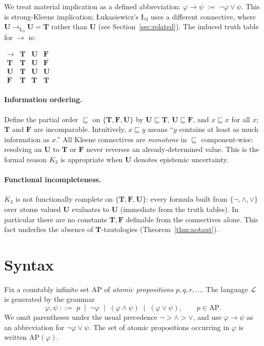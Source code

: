 \documentclass[11pt,a4paper]{article}
\theoremstyle{definition}
\theoremstyle{plain}
\theoremstyle{remark}
\newcommand{\Tv}{\mathbf{T}}
\newcommand{\Fv}{\mathbf{F}}
\newcommand{\Uv}{\mathbf{U}}
\newcommand{\Vals}{\{\Tv, \Fv, \Uv\}}
\newcommand{\Lang}{\mathcal{L}}
\newcommand{\AP}{\mathrm{AP}}
\begin{document}
We treat material implication as a defined abbreviation: $\varphi \to
\psi \;:=\; \lnot\varphi \lor \psi$. This is strong-Kleene implication;
{\L}ukasiewicz's $\text{\L}_3$ uses a different connective, where
$\Uv \to_{\text{\L}_3} \Uv = \Tv$ rather than $\Uv$ (see
Section~\ref{sec:related}). The induced truth table for $\to$ is:
\begin{center}
$\begin{array}{c|ccc}
\to & \Tv & \Uv & \Fv \\ \hline
\Tv & \Tv & \Uv & \Fv \\
\Uv & \Tv & \Uv & \Uv \\
\Fv & \Tv & \Tv & \Tv
\end{array}$
\end{center}

\paragraph{Information ordering.}
Define the partial order $\sqsubseteq$ on $\Vals$ by $\Uv \sqsubseteq \Tv$,
$\Uv \sqsubseteq \Fv$, and $x \sqsubseteq x$ for all $x$; $\Tv$ and $\Fv$
are incomparable. Intuitively, $x \sqsubseteq y$ means ``$y$ contains at
least as much information as $x$.'' All Kleene connectives are
\emph{monotone} in $\sqsubseteq$ component-wise: resolving an $\Uv$ to
$\Tv$ or $\Fv$ never reverses an already-determined value. This is the
formal reason $K_3$ is appropriate when $\Uv$ denotes epistemic
uncertainty.

\paragraph{Functional incompleteness.}
$K_3$ is not functionally complete on $\Vals$: every formula built from
$\{\lnot, \land, \lor\}$ over atoms valued $\Uv$ evaluates to $\Uv$
(immediate from the truth tables). In particular there are no constants
$\Tv, \Fv$ definable from the connectives alone. This fact underlies the
absence of $\Tv$-tautologies (Theorem~\ref{thm:notaut}).

\section{Syntax}
\label{sec:syntax}

Fix a countably infinite set $\AP$ of \emph{atomic propositions}
$p, q, r, \ldots$. The language $\Lang$ is generated by the grammar
\[
\varphi, \psi \;::=\; p \;\mid\; \lnot\varphi \;\mid\; (\varphi \land \psi)
\;\mid\; (\varphi \lor \psi),
\qquad p \in \AP.
\]
We omit parentheses under the usual precedence
$\lnot > \land > \lor$, and use $\varphi \to \psi$ as an abbreviation for
$\lnot\varphi \lor \psi$. The set of atomic propositions occurring in
$\varphi$ is written $\AP(\varphi)$.
\end{document}
